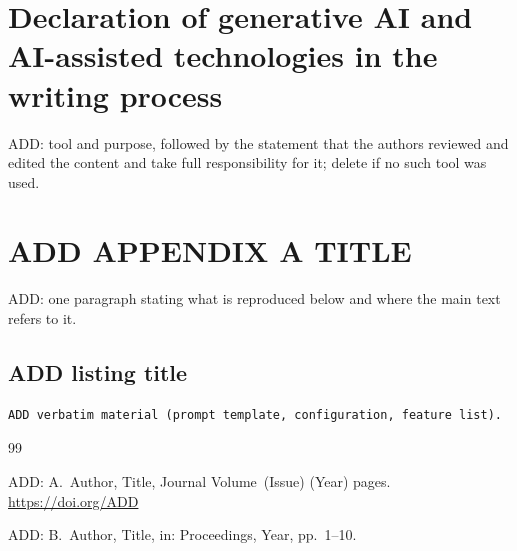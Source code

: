 \documentclass[final,5p,twocolumn]{elsarticle}
\begin{document}
\section*{Declaration of generative AI and AI-assisted technologies in the writing process}
ADD: tool and purpose, followed by the statement that the authors reviewed and edited the content and take full responsibility for it; delete if no such tool was used.

\appendix


\section{ADD APPENDIX A TITLE}
\label{app:a}
ADD: one paragraph stating what is reproduced below and where the main text refers to it.

\subsection{ADD listing title}
\label{app:a1}
\begin{lstlisting}
ADD verbatim material (prompt template, configuration, feature list).
\end{lstlisting}


\begingroup
\footnotesize
\sloppy{}
\begin{thebibliography}{99}

ADD: A.~Author, Title, Journal Volume~(Issue) (Year) pages. \url{https://doi.org/ADD}

ADD: B.~Author, Title, in: Proceedings, Year, pp.~1--10.

\end{thebibliography}
\endgroup
\end{document}
